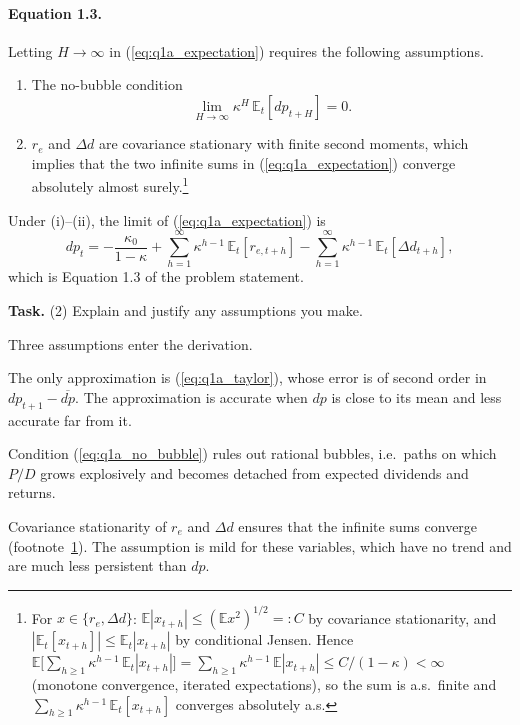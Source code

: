 \documentclass[11pt]{article}
\makeatletter
\newcommand{\E}{\mathbb{E}}
\newcommand{\dpr}{\mathit{dp}}   %
\newcommand{\task}[1]{\par\if@nobreak\else\needspace{5\baselineskip}\fi\medskip\noindent
  \begin{minipage}{\linewidth}\textbf{Task.} #1\end{minipage}\par   %
  \nopagebreak\medskip\@afterheading}   %
\makeatother
\begin{document}
\paragraph{Equation 1.3.}
Letting $H \to \infty$ in (\ref{eq:q1a_expectation}) requires the following assumptions.
\begin{enumerate}[label=(\roman*)]
  \item The no-bubble condition
    \begin{equation}
      \lim_{H \to \infty} \kappa^{H}\, \E_t[\dpr_{t+H}] = 0.
      \label{eq:q1a_no_bubble}
    \end{equation}
  \item $r_e$ and $\Delta d$ are covariance stationary with finite second moments, which
    implies that the two infinite sums in (\ref{eq:q1a_expectation}) converge absolutely
    almost surely.\footnote{\label{fn:q1a_convergence}For $x \in \{r_e, \Delta d\}$:
    $\E|x_{t+h}| \le (\E x^2)^{1/2} =: C$ by covariance stationarity, and
    $|\E_t[x_{t+h}]| \le \E_t|x_{t+h}|$ by conditional Jensen. Hence
    $\E\bigl[\sum_{h\ge1} \kappa^{h-1}\, \E_t|x_{t+h}|\bigr]
      = \sum_{h\ge1} \kappa^{h-1}\, \E|x_{t+h}| \le C/(1-\kappa) < \infty$
    (monotone convergence, iterated expectations), so the sum is a.s.\ finite and
    $\sum_{h\ge1} \kappa^{h-1}\, \E_t[x_{t+h}]$ converges absolutely a.s.}
\end{enumerate}
Under (i)--(ii), the limit of (\ref{eq:q1a_expectation}) is
\begin{equation}
  \dpr_t = -\frac{\kappa_0}{1 - \kappa}
           + \sum_{h=1}^{\infty} \kappa^{h-1}\, \E_t[r_{e,t+h}]
           - \sum_{h=1}^{\infty} \kappa^{h-1}\, \E_t[\Delta d_{t+h}],
  \label{eq:q1a_infinite}
\end{equation}
which is Equation 1.3 of the problem statement.

\task{(2) Explain and justify any assumptions you make.}

\noindent Three assumptions enter the derivation.
\begin{description}[leftmargin=1.5em, labelindent=0em, itemsep=0.4em]
  \item[Log-linearization.] The only approximation is (\ref{eq:q1a_taylor}), whose error is
    of second order in $\dpr_{t+1} - \overline{\dpr}$. The approximation is accurate when
    $\dpr$ is close to its mean and less accurate far from it.
  \item[No bubble (i).] Condition (\ref{eq:q1a_no_bubble}) rules out rational bubbles,
    i.e.\ paths on which $P/D$ grows explosively and becomes detached from expected
    dividends and returns.
  \item[Stationarity (ii).] Covariance stationarity of $r_e$ and $\Delta d$ ensures that
    the infinite sums converge (footnote~\ref{fn:q1a_convergence}). The assumption is mild
    for these variables, which have no trend and are much less persistent than $\dpr$.
\end{description}
\end{document}
